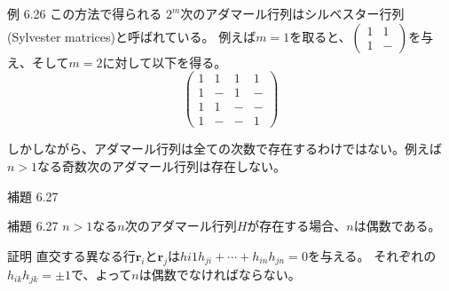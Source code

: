 \documentclass[dvipdfmx,10pt,jsarticle]{beamer}
\begin{document}
  \begin{frame}{例 6.26}
      この方法で得られる $2^m$次のアダマール行列はシルベスター行列 (Sylvester matrices)と呼ばれている。
      例えば$m = 1$を取ると、$\begin{pmatrix} 1 & 1 \\ 1 & - \end{pmatrix}$を与え、そして$m = 2$に対して以下を得る。
      \[ \begin{pmatrix}
          1 & 1 & 1 & 1 \\
          1 & - & 1 & - \\
          1 & 1 & - & - \\
          1 & - & - & 1
      \end{pmatrix} \]

      しかしながら、アダマール行列は全ての次数で存在するわけではない。例えば$n > 1$なる奇数次のアダマール行列は存在しない。
  \end{frame}

  \begin{frame}{補題 6.27}
    \begin{block}{補題 6.27}
      $n > 1$なる$n$次のアダマール行列$H$が存在する場合、$n$は偶数である。
    \end{block}

      \begin{block}{証明}
        直交する異なる行$\mathbf{r}_i$と$\mathbf{r}_j$は$h{i1}h_{ji} + \cdots + h_{in}h_{jn} = 0$を与える。
        それぞれの$h_{ik}h_{jk} = \pm1$で、よって$n$は偶数でなければならない。
      \end{block}
  \end{frame}
\end{document}

